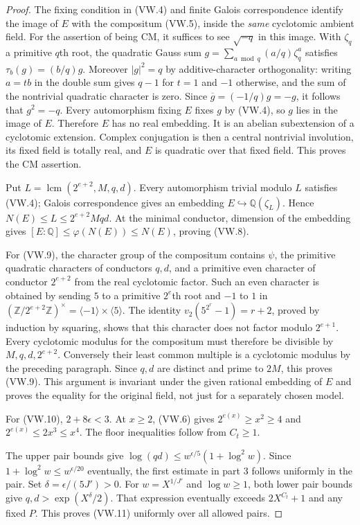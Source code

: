 \begin{proof}
The fixing condition in (VW.4) and finite Galois correspondence identify
the image of $E$ with the compositum (VW.5), inside the \emph{same}
cyclotomic ambient field.  For the assertion of being CM, it suffices to
see $\sqrt{-q}$ in this image.  With $\zeta_q$ a primitive $q$th root,
the quadratic Gauss sum
$g=\sum_{a\bmod q}(a/q)\zeta_q^a$ satisfies
$\tau_b(g)=(b/q)g$.  Moreover $|g|^2=q$ by additive-character
orthogonality: writing $a=tb$ in the double sum gives $q-1$ for $t=1$
and $-1$ otherwise, and the sum of the nontrivial quadratic character
is zero.  Since $\overline g=(-1/q)g=-g$, it follows that $g^2=-q$.
Every automorphism fixing $E$ fixes $g$ by (VW.4), so $g$ lies in the
image of $E$.  Therefore $E$ has no real embedding.  It is an abelian
subextension of a cyclotomic extension.  Complex conjugation is then a
central nontrivial involution, its fixed field is totally real, and
$E$ is quadratic over that fixed field.  This proves the CM assertion.

Put $L=\operatorname{lcm}(2^{e+2},M,q,d)$.  Every automorphism trivial
modulo $L$ satisfies (VW.4); Galois correspondence gives an embedding
$E\hookrightarrow\mathbb Q(\zeta_L)$.  Hence $N(E)\le L\le2^{e+2}Mqd$.
At the minimal conductor, dimension of the embedding gives
$[E:\mathbb Q]\le\varphi(N(E))\le N(E)$, proving (VW.8).

For (VW.9), the character group of the compositum contains $\psi$, the
primitive quadratic characters of conductors $q,d$, and a primitive
even character of conductor $2^{e+2}$ from the real cyclotomic factor.
Such an even character is obtained by sending $5$ to a primitive
$2^e$th root and $-1$ to $1$ in
$(\mathbb Z/2^{e+2}\mathbb Z)^\times
 =\langle-1\rangle\times\langle5\rangle$.
The identity $v_2(5^{2^r}-1)=r+2$, proved by induction by squaring,
shows that this character does not factor modulo $2^{e+1}$.
Every cyclotomic modulus for the compositum must therefore be divisible
by $M,q,d,2^{e+2}$.  Conversely their least common multiple is a
cyclotomic modulus by the preceding paragraph.  Since $q,d$ are distinct
and prime to $2M$, this proves (VW.9).  This argument is invariant under
the given rational embedding of $E$ and proves the equality for the
original field, not just for a separately chosen model.

For (VW.10), $2+8\epsilon<3$.  At $x\ge2$, (VW.6) gives
$2^{e(x)}\ge x^2\ge4$ and
$2^{e(x)}\le2x^3\le x^4$.
The floor inequalities follow from $C_t\ge1$.

The upper pair bounds give
$\log(qd)\le w^{\epsilon/5}(1+\log^2w)$.
Since $1+\log^2w\le w^{\epsilon/20}$ eventually, the first estimate
in part 3 follows uniformly in the pair.  Set
$\delta=\epsilon/(5J')>0$.  For $w=X^{1/J'}$ and $\log w\ge1$,
both lower pair bounds give $q,d>\exp(X^\delta/2)$.
That expression eventually exceeds $2X^{C_t}+1$ and any fixed $P$.
This proves (VW.11) uniformly over all allowed pairs.


\end{proof}
